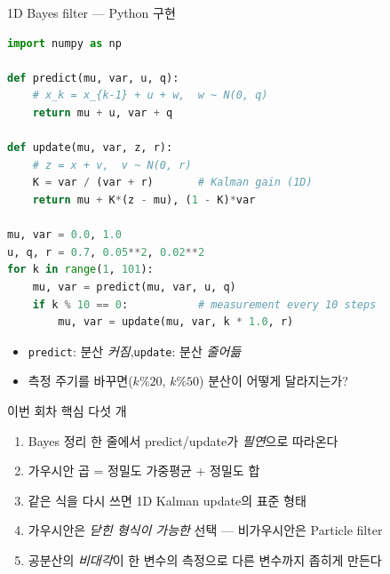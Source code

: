 \begin{frame}[fragile,shrink=10]{1D Bayes filter — Python 구현}
\begin{lstlisting}[language=Python]
import numpy as np

def predict(mu, var, u, q):
    # x_k = x_{k-1} + u + w,  w ~ N(0, q)
    return mu + u, var + q

def update(mu, var, z, r):
    # z = x + v,  v ~ N(0, r)
    K = var / (var + r)       # Kalman gain (1D)
    return mu + K*(z - mu), (1 - K)*var

mu, var = 0.0, 1.0
u, q, r = 0.7, 0.05**2, 0.02**2
for k in range(1, 101):
    mu, var = predict(mu, var, u, q)
    if k % 10 == 0:           # measurement every 10 steps
        mu, var = update(mu, var, k * 1.0, r)
\end{lstlisting}
  \begin{itemize}\footnotesize
    \item \texttt{predict}: 분산 \emph{커짐},\quad \texttt{update}: 분산 \emph{줄어듦}
    \item 측정 주기를 바꾸면($k\%20$, $k\%50$) 분산이 어떻게 달라지는가?
  \end{itemize}
\end{frame}

\begin{frame}{이번 회차 핵심 다섯 개}
  \begin{enumerate}
    \item Bayes 정리 한 줄에서 predict/update가 \emph{필연}으로 따라온다
    \item 가우시안 곱 = 정밀도 가중평균 + 정밀도 합
    \item 같은 식을 다시 쓰면 1D Kalman update의 표준 형태
    \item 가우시안은 \emph{닫힌 형식이 가능한} 선택 — 비가우시안은 Particle filter
    \item 공분산의 \emph{비대각}이 한 변수의 측정으로 다른 변수까지 좁히게 만든다
  \end{enumerate}
\end{frame}

